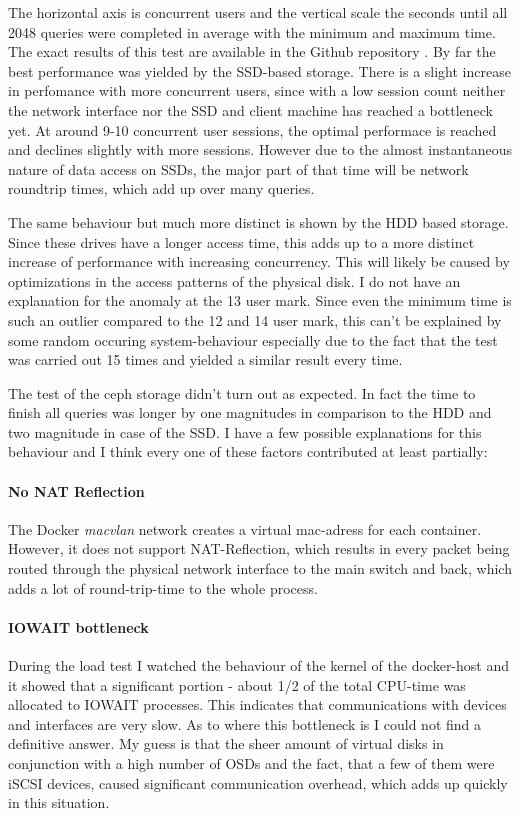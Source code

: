 \documentclass[titlepage, a4paper, 11pt]{scrartcl}
\begin{document}
                The horizontal axis is concurrent users and the vertical scale the seconds until all 2048 queries were completed in average with the minimum and maximum time. The exact results of this test are available in the Github repository \cite{ghceph}. By far the best performance was yielded by the SSD-based storage. There is a slight increase in perfomance with more concurrent users, since with a low session count neither the network interface nor the SSD and client machine has reached a bottleneck yet.
                At around 9-10 concurrent user sessions, the optimal performace is reached and declines slightly with more sessions. However due to the almost instantaneous nature of data access on SSDs, the major part of that time will be network roundtrip times, which add up over many queries.

                The same behaviour but much more distinct is shown by the HDD based storage. Since these drives have a longer access time, this adds up to a more distinct increase of performance with increasing concurrency.
                This will likely be caused by optimizations in the access patterns of the physical disk. I do not have an explanation for the anomaly at the 13 user mark. Since even the minimum time is such an outlier compared to the 12 and 14 user mark, this can't be explained by some random occuring system-behaviour especially due to the fact that the test was carried out 15 times and yielded a similar result every time.

                The test of the ceph storage didn't turn out as expected. In fact the time to finish all queries was longer by one magnitudes in comparison to the HDD and two magnitude in case of the SSD.
                I have a few possible explanations for this behaviour and I think every one of these factors contributed at least partially:
                
                \paragraph{No NAT Reflection} The Docker \textit{macvlan} network creates a virtual mac-adress for each container. However, it does not support NAT-Reflection, which results in every packet being routed through the physical network interface to the main switch and back, which adds a lot of round-trip-time to the whole process.

                \paragraph{IOWAIT bottleneck} During the load test I watched the behaviour of the kernel of the docker-host and it showed that a significant portion - about 1/2 of the total CPU-time was allocated to IOWAIT processes. This indicates that communications with devices and interfaces are very slow. As to where this bottleneck is I could not find a definitive answer. My guess is that the sheer amount of virtual disks in conjunction with a high number of OSDs and the fact, that a few of them were iSCSI devices, caused significant communication overhead, which adds up quickly in this situation.
\end{document}
